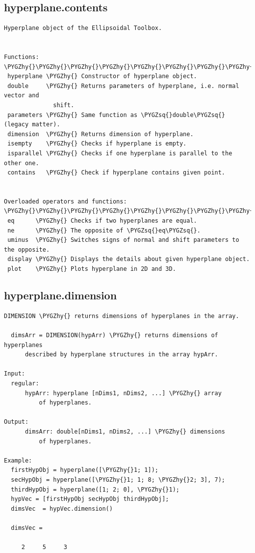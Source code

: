 \documentclass[letterpaper,10pt,english]{sphinxmanual}
\def\PYGZhy{\char`\-}
\def\PYGZsq{\char`\'}
\begin{document}
\subsection{hyperplane.contents}
\label{chap_functions:hyperplane-contents}
\begin{Verbatim}[commandchars=\\\{\}]
Hyperplane object of the Ellipsoidal Toolbox.


Functions:
\PYGZhy{}\PYGZhy{}\PYGZhy{}\PYGZhy{}\PYGZhy{}\PYGZhy{}\PYGZhy{}\PYGZhy{}\PYGZhy{}\PYGZhy{}
 hyperplane \PYGZhy{} Constructor of hyperplane object.
 double     \PYGZhy{} Returns parameters of hyperplane, i.e. normal vector and
              shift.
 parameters \PYGZhy{} Same function as \PYGZsq{}double\PYGZsq{} (legacy matter).
 dimension  \PYGZhy{} Returns dimension of hyperplane.
 isempty    \PYGZhy{} Checks if hyperplane is empty.
 isparallel \PYGZhy{} Checks if one hyperplane is parallel to the other one.
 contains   \PYGZhy{} Check if hyperplane contains given point.


Overloaded operators and functions:
\PYGZhy{}\PYGZhy{}\PYGZhy{}\PYGZhy{}\PYGZhy{}\PYGZhy{}\PYGZhy{}\PYGZhy{}\PYGZhy{}\PYGZhy{}\PYGZhy{}\PYGZhy{}\PYGZhy{}\PYGZhy{}\PYGZhy{}\PYGZhy{}\PYGZhy{}\PYGZhy{}\PYGZhy{}\PYGZhy{}\PYGZhy{}\PYGZhy{}\PYGZhy{}\PYGZhy{}\PYGZhy{}\PYGZhy{}\PYGZhy{}\PYGZhy{}\PYGZhy{}\PYGZhy{}\PYGZhy{}\PYGZhy{}\PYGZhy{}\PYGZhy{}\PYGZhy{}
 eq      \PYGZhy{} Checks if two hyperplanes are equal.
 ne      \PYGZhy{} The opposite of \PYGZsq{}eq\PYGZsq{}.
 uminus  \PYGZhy{} Switches signs of normal and shift parameters to the opposite.
 display \PYGZhy{} Displays the details about given hyperplane object.
 plot    \PYGZhy{} Plots hyperplane in 2D and 3D.
\end{Verbatim}


\subsection{hyperplane.dimension}
\label{chap_functions:hyperplane-dimension}
\begin{Verbatim}[commandchars=\\\{\}]
DIMENSION \PYGZhy{} returns dimensions of hyperplanes in the array.

  dimsArr = DIMENSION(hypArr) \PYGZhy{} returns dimensions of hyperplanes
      described by hyperplane structures in the array hypArr.

Input:
  regular:
      hypArr: hyperplane [nDims1, nDims2, ...] \PYGZhy{} array
          of hyperplanes.

Output:
      dimsArr: double[nDims1, nDims2, ...] \PYGZhy{} dimensions
          of hyperplanes.

Example:
  firstHypObj = hyperplane([\PYGZhy{}1; 1]);
  secHypObj = hyperplane([\PYGZhy{}1; 1; 8; \PYGZhy{}2; 3], 7);
  thirdHypObj = hyperplane([1; 2; 0], \PYGZhy{}1);
  hypVec = [firstHypObj secHypObj thirdHypObj];
  dimsVec  = hypVec.dimension()

  dimsVec =

     2     5     3
\end{Verbatim}
\end{document}
